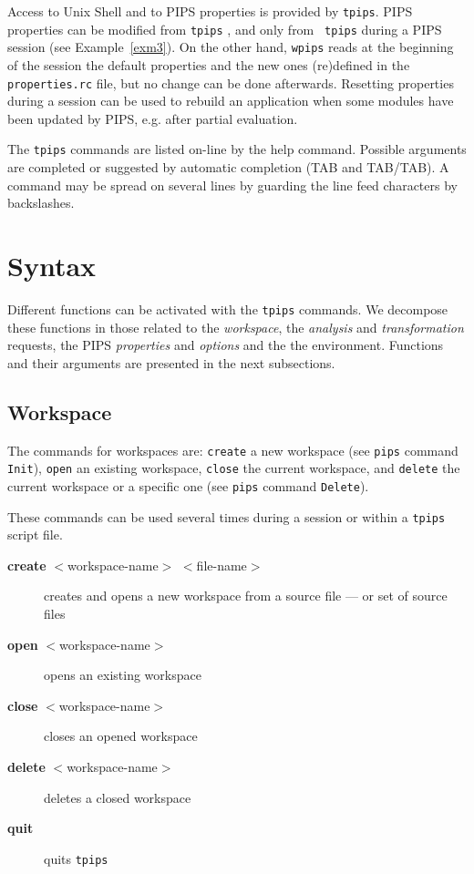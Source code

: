 \documentclass[a4paper]{article}
\begin{document}
Access to Unix Shell and to PIPS properties is provided by {\tt tpips}.
PIPS properties can be modified from {\tt tpips} , and only from {\tt
  tpips} during a PIPS session (see Example~\ref{exm3}). On the other hand,
{\tt wpips} reads at the
beginning of the session the default properties and the new ones
(re)defined in the {\tt properties.rc} file, but no change can be done
afterwards.  Resetting properties during a session can be used to rebuild
an application when some modules have been updated by PIPS, e.g. after
partial evaluation.

The {\tt tpips} commands are listed on-line by the help command.
Possible arguments are completed or suggested by automatic
completion (TAB and TAB/TAB). A command may be spread on
several lines by guarding the line feed characters by
backslashes.


\section{Syntax}

Different functions can be activated with the \texttt{tpips} commands. We
decompose these functions in those related to the \emph{workspace}, the
\emph{analysis} and \emph{transformation} requests, the PIPS
\emph{properties} and \emph{options} and the the environment.  Functions
and their arguments are presented in the next subsections.


\subsection{Workspace}

The commands for workspaces are: {\tt create} a new workspace (see
\texttt{pips} command \texttt{Init}), {\tt open} an existing workspace,
{\tt close} the current workspace, and {\tt delete} the current workspace
or a specific one (see \texttt{pips} command \texttt{Delete}).

These commands can be used several times during a session or
within a {\tt tpips} script file.

\begin{description}

\item[{\bf create} $<$workspace-name$>$ $<$file-name$>$] creates and
  opens a new workspace from a source file --- or set of source files

\item[{\bf open} $<$workspace-name$>$] opens an existing workspace

\item[{\bf close} $<$workspace-name$>$] closes an opened workspace

\item[{\bf delete} $<$workspace-name$>$] deletes a closed workspace

\item[{\bf quit}] quits {\tt tpips}

\end{description}
\end{document}
